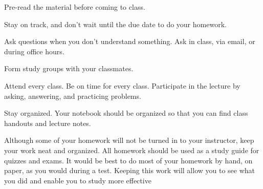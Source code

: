 \begin{outline}

	\1  Pre-read the material before coming to class.

	\1 Stay on track, and don't wait until the due date to do your homework.

	\1  Ask questions when you don't understand something. Ask in class, via email, or during office hours.

	\1 Form study groups with your classmates.

	\1  Attend every class. Be on time for every class. Participate in the lecture by asking, answering, and practicing problems.

	\1 Stay organized. Your notebook should be organized so that you can find class handouts and lecture notes.

	\1  Although some of your homework will not be turned in to your instructor, keep your work neat and organized. All homework should be used as a study guide for quizzes and exams. It would be best to do most of your homework by hand, on paper, as you would during a test. Keeping this work will allow you to see what you did and enable you to study more effective

\end{outline}
